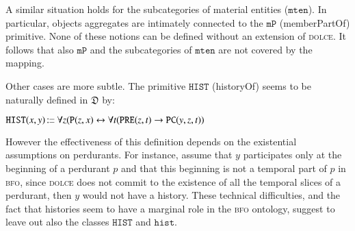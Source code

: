 \documentclass[ao]{iosart2x}
\newcommand{\nb}[1]{\textcolor{red}{$|$}\marginpar{\hspace*{-0cm}\parbox{20mm}{\scriptsize\raggedright\textcolor{red}{#1}}}}
\newcommand{\bflist}{\begin{list}{}{\setlength{\topsep}{2mm}\setlength{\parsep}{0mm}\setlength{\leftmargin}{9.2mm}\setlength{\labelwidth}{8mm}}}
\newcommand{\eflist}{\end{list}}
\newcommand{\pr}[1]{\mathtt{#1}}
\newcommand{\cn}[1]{\mathtt{#1}}
\newcommand{\ifif}{\leftrightarrow}
\newcommand\textequal{%
 \rule[.08ex]{5pt}{0.35pt}\llap{\rule[.78ex]{5pt}{0.35pt}}}
\newcommand{\sdef}{{\hspace{1.5pt}:\hspace{-2.5pt}\textequal\hspace{3pt}}}
\newcommand{\dolce}{{\textsc{dolce}}}
\newcommand{\bfo}{{\textsc{bfo}}}
\newcommand {\thdolce} {\ensuremath{\mathfrak{D}}}
\newcommand {\Pd} {\ensuremath{\pr{P}}}
\newcommand {\PREd} {\ensuremath{\pr{PRE}}}
\newcommand {\PCd} {\ensuremath{\pr{PC}}}
\newcommand{\mtenbcat}{\cn{mten}}
\newcommand{\histbcat}{\cn{hist}}
\newcommand{\bfompart}{\pr{mP}}
\newcommand{\bfohistory}{\pr{HIST}}
\begin{document}
A similar situation holds for the subcategories of material entities ($\mtenbcat$). In particular, objects aggregates are intimately connected to the $\bfompart$ (memberPartOf) primitive. None of these notions can be defined without an extension of {\dolce}. It follows that also $\bfompart$ and the subcategories of $\mtenbcat$ are not covered by the mapping.

Other cases are more subtle. The primitive $\bfohistory$ (historyOf) seems to be naturally defined in $\thdolce$ by:
%
\bflist
\item[] $\bfohistory(x,y) \sdef \forall z(\Pd(z,x) \ifif \forall t(\PREd(z,t) \to \PCd(y,z,t))$
\eflist
%
However the effectiveness of this definition depends on the existential assumptions on perdurants. 
For instance, assume that $y$ participates only at the beginning of a perdurant $p$ and that this beginning is not a temporal part of $p$ in {\bfo}, since {\dolce} does not commit to the existence of all the temporal slices of a perdurant, then $y$ would not have a history. %
These technical difficulties, and the fact that histories seem to have a marginal role in the {\bfo} ontology, suggest to leave out also the classes $\bfohistory$ and $\histbcat$.
\end{document}
